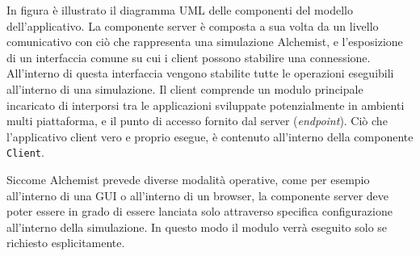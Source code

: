 %
In figura  è illustrato il diagramma UML delle componenti del modello dell'applicativo. La componente server è composta a sua volta da un livello comunicativo con ciò che rappresenta
una simulazione Alchemist, e l'esposizione di un interfaccia comune su cui i client possono stabilire una connessione. All'interno di questa interfaccia vengono stabilite tutte le operazioni eseguibili
all'interno di una simulazione. Il client comprende un modulo principale incaricato di interporsi tra le applicazioni sviluppate potenzialmente in ambienti multi piattaforma, e il punto di accesso
fornito dal server (\textit{endpoint}). Ciò che l'applicativo client vero e proprio esegue, è contenuto all'interno della componente \texttt{Client}.


Siccome Alchemist prevede diverse modalità operative, come per esempio all'interno di una GUI o all'interno di un browser, la componente server deve poter essere in grado di essere lanciata solo attraverso
specifica configurazione all'interno della simulazione. In questo modo il modulo verrà eseguito solo se richiesto esplicitamente.
